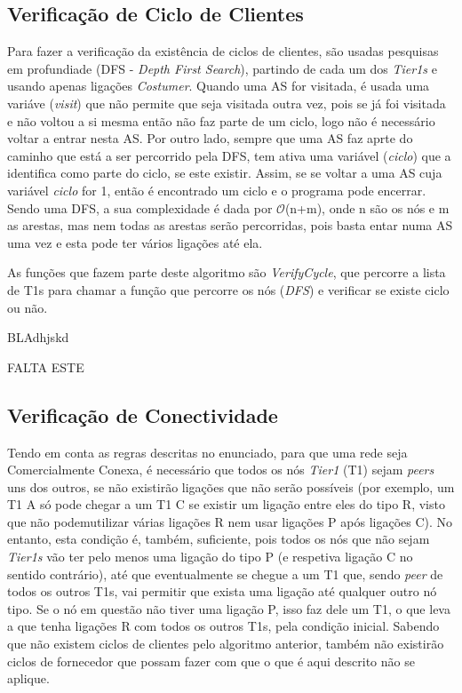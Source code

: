 \documentclass[twocolumn]{article} %
\begin{document}
		\subsection{Verificação de Ciclo de Clientes}

			Para fazer a verificação da existência de ciclos de clientes, são usadas pesquisas em profundiade (DFS - \emph{Depth First Search}), partindo de cada um dos \emph{Tier1s} e usando apenas ligações \emph{Costumer}. Quando uma AS for visitada, é usada uma variáve (\emph{visit}) que não permite que seja visitada outra vez, pois se já foi visitada e não voltou a si mesma então não faz parte de um ciclo, logo não é necessário voltar a entrar nesta AS. Por outro lado, sempre que uma AS faz aprte do caminho que está a ser percorrido pela DFS, tem ativa uma variável (\emph{ciclo}) que a identifica como parte do ciclo, se este existir. Assim, se se voltar a uma AS cuja variável \emph{ciclo} for 1, então é encontrado um ciclo e o programa pode encerrar. Sendo uma DFS, a sua complexidade é dada por $\mathcal{O}$(n+m), onde n são os nós e m as arestas, mas nem todas as arestas serão percorridas, pois basta entar numa AS uma vez e esta pode ter vários ligações até ela.

			\noindent As funções que fazem parte deste algoritmo são \emph{VerifyCycle}, que percorre a lista de T1s para chamar a função que percorre os nós (\emph{DFS}) e verificar se existe ciclo ou não. 

			\begin{algorithm}[htbp]
			\caption{BLAdhjskd}
			\begin{algorithmic}[1]
				
				\State FALTA ESTE
				
			\end{algorithmic}
			\end{algorithm}

		\subsection{Verificação de Conectividade}

			Tendo em conta as regras descritas no enunciado, para que uma rede seja Comercialmente Conexa, é necessário que todos os nós \emph{Tier1} (T1) sejam \emph{peers} uns dos outros, se não existirão ligações que não serão possíveis (por exemplo, um T1 A só pode chegar a um T1 C se existir um ligação entre eles do tipo R, visto que não podemutilizar várias ligações R nem usar ligações P após ligações C). No entanto, esta condição é, também, suficiente, pois todos os nós que não sejam \emph{Tier1s} vão ter pelo menos uma ligação do tipo P (e respetiva ligação C no sentido contrário), até que eventualmente se chegue a um T1 que, sendo \emph{peer} de todos os outros T1s, vai permitir que exista uma ligação até qualquer outro nó tipo. Se o nó em questão não tiver uma ligação P, isso faz dele um T1, o que leva a que tenha ligações R com todos os outros T1s, pela condição inicial. Sabendo que não existem ciclos de clientes pelo algoritmo anterior, também não existirão ciclos de fornecedor que possam fazer com que o que é aqui descrito não se aplique.\\
\end{document}
